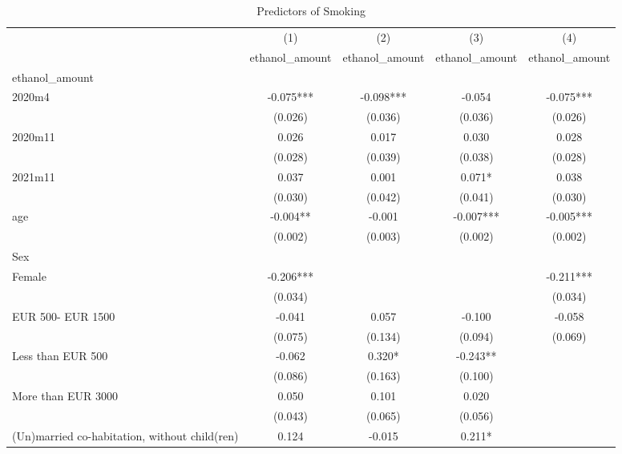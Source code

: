 \begin{table}[htbp]\centering
\def\sym#1{\ifmmode^{#1}\else\(^{#1}\)\fi}
\caption{Predictors of Smoking}
\begin{tabular}{l*{4}{c}}
\toprule
                &\multicolumn{1}{c}{(1)}&\multicolumn{1}{c}{(2)}&\multicolumn{1}{c}{(3)}&\multicolumn{1}{c}{(4)}\\
                &\multicolumn{1}{c}{ethanol\_amount}&\multicolumn{1}{c}{ethanol\_amount}&\multicolumn{1}{c}{ethanol\_amount}&\multicolumn{1}{c}{ethanol\_amount}\\
\midrule
ethanol\_amount  &            &            &            &            \\
 2020m4         &   -0.075***&   -0.098***&   -0.054   &   -0.075***\\
                &  (0.026)   &  (0.036)   &  (0.036)   &  (0.026)   \\
2020m11         &    0.026   &    0.017   &    0.030   &    0.028   \\
                &  (0.028)   &  (0.039)   &  (0.038)   &  (0.028)   \\
2021m11         &    0.037   &    0.001   &    0.071*  &    0.038   \\
                &  (0.030)   &  (0.042)   &  (0.041)   &  (0.030)   \\
age             &   -0.004** &   -0.001   &   -0.007***&   -0.005***\\
                &  (0.002)   &  (0.003)   &  (0.002)   &  (0.002)   \\
Sex             &            &            &            &            \\
Female          &   -0.206***&            &            &   -0.211***\\
                &  (0.034)   &            &            &  (0.034)   \\
EUR 500- EUR 1500&   -0.041   &    0.057   &   -0.100   &   -0.058   \\
                &  (0.075)   &  (0.134)   &  (0.094)   &  (0.069)   \\
Less than EUR 500&   -0.062   &    0.320*  &   -0.243** &            \\
                &  (0.086)   &  (0.163)   &  (0.100)   &            \\
More than EUR 3000&    0.050   &    0.101   &    0.020   &            \\
                &  (0.043)   &  (0.065)   &  (0.056)   &            \\
(Un)married co-habitation, without child(ren)&    0.124   &   -0.015   &    0.211*  &            \\

\end{tabular}
\end{table}
